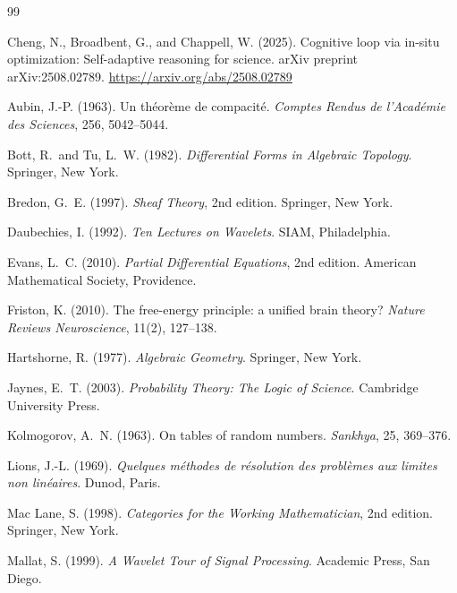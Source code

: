 \documentclass[12pt, oneside]{article}
\begin{document}
\newpage
\begin{thebibliography}{99}

Cheng, N., Broadbent, G., and Chappell, W. (2025).
\newblock Cognitive loop via in-situ optimization: Self-adaptive reasoning for science.
\newblock arXiv preprint arXiv:2508.02789.
\newblock \url{https://arxiv.org/abs/2508.02789}

Aubin, J.-P. (1963).
\newblock Un th\'eor\`eme de compacit\'e.
\newblock \emph{Comptes Rendus de l'Acad\'emie des Sciences}, 256, 5042--5044.

Bott, R.\ and Tu, L.\ W. (1982).
\newblock \emph{Differential Forms in Algebraic Topology}.
\newblock Springer, New York.

Bredon, G.\ E. (1997).
\newblock \emph{Sheaf Theory}, 2nd edition.
\newblock Springer, New York.

Daubechies, I. (1992).
\newblock \emph{Ten Lectures on Wavelets}.
\newblock SIAM, Philadelphia.

Evans, L.\ C. (2010).
\newblock \emph{Partial Differential Equations}, 2nd edition.
\newblock American Mathematical Society, Providence.

Friston, K. (2010).
\newblock The free-energy principle: a unified brain theory?
\newblock \emph{Nature Reviews Neuroscience}, 11(2), 127--138.

Hartshorne, R. (1977).
\newblock \emph{Algebraic Geometry}.
\newblock Springer, New York.

Jaynes, E.\ T. (2003).
\newblock \emph{Probability Theory: The Logic of Science}.
\newblock Cambridge University Press.

Kolmogorov, A.\ N. (1963).
\newblock On tables of random numbers.
\newblock \emph{Sankhya}, 25, 369--376.

Lions, J.-L. (1969).
\newblock \emph{Quelques m\'ethodes de r\'esolution des probl\`emes aux limites non lin\'eaires}.
\newblock Dunod, Paris.

Mac Lane, S. (1998).
\newblock \emph{Categories for the Working Mathematician}, 2nd edition.
\newblock Springer, New York.

Mallat, S. (1999).
\newblock \emph{A Wavelet Tour of Signal Processing}.
\newblock Academic Press, San Diego.


\end{thebibliography}
\end{document}
